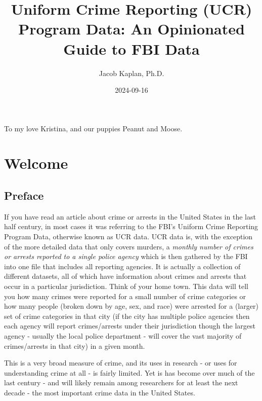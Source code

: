 \documentclass[
]{krantz}
\title{Uniform Crime Reporting (UCR) Program Data: An
Opinionated Guide to FBI Data}
\author{Jacob Kaplan, Ph.D.}
\date{2024-09-16}
\begin{document}
\maketitle

\thispagestyle{empty}
\begin{center}
To my love Kristina, and our puppies Peanut and Moose.
\end{center}

\setlength{\abovedisplayskip}{-5pt}
\setlength{\abovedisplayshortskip}{-5pt}

{
\hypersetup{linkcolor=}
\setcounter{tocdepth}{2}
\tableofcontents
}
\mainmatter

\part{Welcome}\label{part-welcome}

\chapter{Preface}\label{preface}

If you have read an article about crime or arrests in the
United States in the last half century, in most cases it was
referring to the FBI's Uniform Crime Reporting Program Data,
otherwise known as UCR data. UCR data is, with the exception
of the more detailed data that only covers murders, a
\emph{monthly number of crimes or arrests reported to a
single police agency} which is then gathered by the FBI into
one file that includes all reporting agencies. It is
actually a collection of different datasets, all of which
have information about crimes and arrests that occur in a
particular jurisdiction. Think of your home town. This data
will tell you how many crimes were reported for a small
number of crime categories or how many people (broken down
by age, sex, and race) were arrested for a (larger) set of
crime categories in that city (if the city has multiple
police agencies then each agency will report crimes/arrests
under their jurisdiction though the largest agency - usually
the local police department - will cover the vast majority
of crimes/arrests in that city) in a given month.

This is a very broad measure of crime, and its uses in
research - or uses for understanding crime at all - is
fairly limited. Yet is has become over much of the last
century - and will likely remain among researchers for at
least the next decade - the most important crime data in the
United States.
\end{document}
